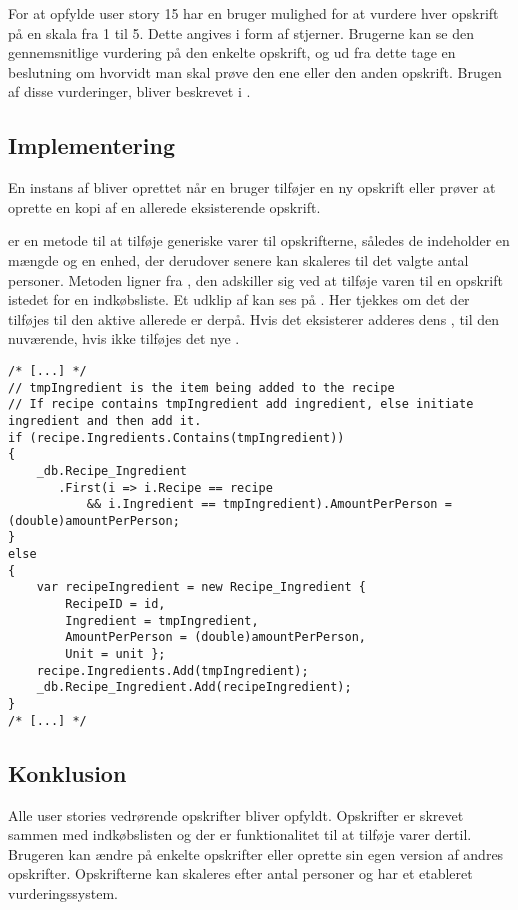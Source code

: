 For at opfylde user story 15 har en bruger mulighed for at vurdere hver opskrift på en skala fra 1 til 5.
Dette angives i form af stjerner.
Brugerne kan se den gennemsnitlige vurdering på den enkelte opskrift, og ud fra dette tage en beslutning om hvorvidt man skal prøve den ene eller den anden opskrift.
Brugen af disse vurderinger, bliver beskrevet i .

\subsection{Implementering}
En instans af  bliver oprettet når en bruger tilføjer en ny opskrift eller prøver at oprette en kopi af en allerede eksisterende opskrift.

 er en metode til at tilføje generiske varer til opskrifterne, således de indeholder en mængde og en enhed, der derudover senere kan skaleres til det valgte antal personer. 
Metoden ligner  fra , den adskiller sig ved at tilføje varen til en opskrift istedet for en indkøbsliste.
Et udklip af  kan ses på .
Her tjekkes om det  der tilføjes til den aktive  allerede er derpå. 
Hvis det eksisterer adderes dens , til den nuværende,
hvis ikke tilføjes det nye .



\begin{lstlisting}[caption={Udklip fra \class{AddIngredient}},label=addIngredient]
/* [...] */      
// tmpIngredient is the item being added to the recipe
// If recipe contains tmpIngredient add ingredient, else initiate ingredient and then add it.
if (recipe.Ingredients.Contains(tmpIngredient))
{
    _db.Recipe_Ingredient
       .First(i => i.Recipe == recipe 
       	   && i.Ingredient == tmpIngredient).AmountPerPerson = (double)amountPerPerson;
}
else
{
    var recipeIngredient = new Recipe_Ingredient { 
    	RecipeID = id, 
    	Ingredient = tmpIngredient, 
    	AmountPerPerson = (double)amountPerPerson, 
    	Unit = unit };
    recipe.Ingredients.Add(tmpIngredient);
    _db.Recipe_Ingredient.Add(recipeIngredient);
}
/* [...] */          
\end{lstlisting}


\subsection{Konklusion}
Alle user stories vedrørende opskrifter bliver opfyldt. 
Opskrifter er skrevet sammen med indkøbslisten og der er funktionalitet til at tilføje varer dertil. 
Brugeren kan ændre på enkelte opskrifter eller oprette sin egen version af andres opskrifter. 
Opskrifterne kan skaleres efter antal personer og har et etableret vurderingssystem. 
